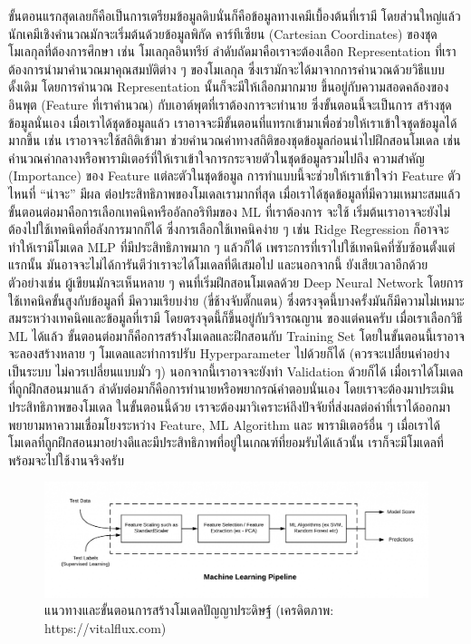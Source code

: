 ขั้นตอนแรกสุดเลยก็คือเป็นการเตรียมข้อมูลดิบนั่นก็คือข้อมูลทางเคมีเบื้องต้นที่เรามี โดยส่วนใหญ่แล้วนักเคมีเชิงคำนวณมักจะเริ่มต้นด้วยข้อมูลพิกัด%
คาร์ทีเซียน (Cartesian Coordinates) ของชุดโมเลกุลที่ต้องการศึกษา เช่น โมเลกุลอินทรีย์ ลำดับถัดมาคือเราจะต้องเลือก Representation 
ที่เราต้องการนำมาคำนวณมาคุณสมบัติต่าง ๆ ของโมเลกุล ซึ่งเรามักจะได้มาจากการคำนวณด้วยวิธีแบบดั้งเดิม โดยการคำนวณ Representation 
นั้นก็จะมีให้เลือกมากมาย ขึ้นอยู่กับความสอดคล้องของอินพุต (Feature ที่เราคำนวณ) กับเอาต์พุตที่เราต้องการจะทำนาย ซึ่งขั้นตอนนี้จะเป็นการ%
สร้างชุดข้อมูลนั่นเอง เมื่อเราได้ชุดข้อมูลแล้ว เราอาจจะมีขั้นตอนที่แทรกเข้ามาเพื่อช่วยให้เราเข้าใจชุดข้อมูลได้มากขึ้น เช่น เราอาจจะใช้สถิติเข้ามา%
ช่วยคำนวณค่าทางสถิติของชุดข้อมูลก่อนนำไปฝึกสอนโมเดล เช่น คำนวณค่ากลางหรือพารามิเตอร์ที่ให้เราเข้าใจการกระจายตัวในชุดข้อมูลรวมไปถึง%
ความสำคัญ (Importance) ของ Feature แต่ละตัวในชุดข้อมูล การทำแบบนี้จะช่วยให้เราเข้าใจว่า Feature ตัวไหนที่ \enquote{น่าจะ} มีผล%
ต่อประสิทธิภาพของโมเดลเรามากที่สุด เมื่อเราได้ชุดข้อมูลที่มีความเหมาะสมแล้ว ขั้นตอนต่อมาคือการเลือกเทคนิคหรืออัลกอริทึมของ ML ที่เราต้องการ%
จะใช้ เริ่มต้นเราอาจจะยังไม่ต้องไปใช้เทคนิคที่อลังการมากก็ได้ ซึ่งการเลือกใช้เทคนิคง่าย ๆ เช่น Ridge Regression ก็อาจจะทำให้เรามีโมเดล MLP
ที่มีประสิทธิภาพมาก ๆ แล้วก็ได้ เพราะการที่เราไปใช้เทคนิคที่ซับซ้อนตั้งแต่แรกนั้น มันอาจจะไม่ได้การันตีว่าเราจะได้โมเดลที่ดีเสมอไป และนอกจากนี้%
ยังเสียเวลาอีกด้วย ตัวอย่างเช่น ผู้เขียนมักจะเห็นหลาย ๆ คนที่เริ่มฝึกสอนโมเดลด้วย Deep Neural Network โดยการใช้เทคนิคขั้นสูงกับข้อมูลที่%
มีความเรียบง่าย (ขี่ช้างจับตั๊กแตน) ซึ่งตรงจุดนี้บางครั้งมันก็มีความไม่เหมาะสมระหว่างเทคนิคและข้อมูลที่เรามี โดยตรงจุดนี้ก็ขึ้นอยู่กับวิจารณญาน%
ของแต่คนครับ เมื่อเราเลือกวิธี ML ได้แล้ว ขั้นตอนต่อมาก็คือการสร้างโมเดลและฝึกสอนกับ Training Set โดยในขั้นตอนนี้เราอาจจะลองสร้างหลาย ๆ 
โมเดลและทำการปรับ Hyperparameter ไปด้วยก็ได้ (ควรจะเปลี่ยนค่าอย่างเป็นระบบ ไม่ควรเปลี่ยนแบบมั่ว ๆ) นอกจากนี้เราอาจจะยังทำ Validation 
ด้วยก็ได้ เมื่อเราได้โมเดลที่ถูกฝึกสอนมาแล้ว ลำดับต่อมาก็คือการทำนายหรือพยากรณ์คำตอบนั่นเอง โดยเราจะต้องมาประเมินประสิทธิภาพของโมเดล%
ในขั้นตอนนี้ด้วย เราจะต้องมาวิเคราะห์ถึงปัจจัยที่ส่งผลต่อค่าที่เราได้ออกมา พยายามหาความเชื่อมโยงระหว่าง Feature, ML Algorithm และ%
พารามิเตอร์อื่น ๆ เมื่อเราได้โมเดลที่ถูกฝึกสอนมาอย่างดีและมีประสิทธิภาพที่อยู่ในเกณฑ์ที่ยอมรับได้แล้วนั้น เราก็จะมีโมเดลที่พร้อมจะไปใช้งานจริงครับ

\begin{figure}[H]
    \centering
    \includegraphics[width=\linewidth]{fig/ml_pipeline.png}
    \caption{แนวทางและขั้นตอนการสร้างโมเดลปัญญาประดิษฐ์ (เครดิตภาพ: https://vitalflux.com)}
    \label{fig:ml_pipeline}
\end{figure}


